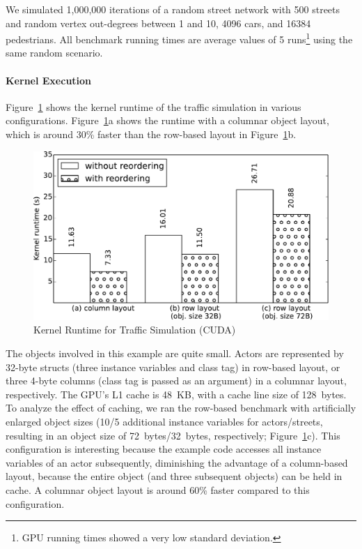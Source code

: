 \documentclass[preprint]{sigplanconf}
\begin{document}
We simulated 1,000,000 iterations of a random street network with 500 streets and random vertex out-degrees between 1 and 10, 4096 cars, and 16384 pedestrians. All benchmark running times are average values of 5 runs\footnote{GPU running times showed a very low standard deviation.} using the same random scenario.

\paragraph{Kernel Execution}
Figure~\ref{fig:bench_kernel} shows the kernel runtime of the traffic simulation in various configurations. Figure~\ref{fig:bench_kernel}a shows the runtime with a columnar object layout, which is around 30\% faster than the row-based layout in Figure~\ref{fig:bench_kernel}b.

\begin{figure}[!htp]
    \includegraphics[width=0.95\columnwidth]{bench_1.pdf}
    \centering
    \caption{Kernel Runtime for Traffic Simulation (CUDA)}
    \label{fig:bench_kernel}
\end{figure}

The objects involved in this example are quite small. Actors are represented by 32-byte structs (three instance variables and class tag) in row-based layout, or three 4-byte columns (class tag is passed as an argument) in a columnar layout, respectively. The GPU's L1 cache is 48~KB, with a cache line size of 128~bytes. To analyze the effect of caching, we ran the row-based benchmark with artificially enlarged object sizes (10/5 additional instance variables for actors/streets, resulting in an object size of 72~bytes/32~bytes, respectively; Figure~\ref{fig:bench_kernel}c). This configuration is interesting because the example code accesses all instance variables of an actor subsequently, diminishing the advantage of a column-based layout, because the entire object (and three subsequent objects) can be held in cache. A columnar object layout is around 60\% faster compared to this configuration.
\end{document}
